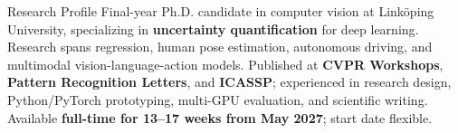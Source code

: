 \begin{rubric}{Research Profile}
\entry*[]
	Final-year Ph.D. candidate in computer vision at Linköping University, specializing in \textbf{uncertainty quantification} for deep learning. Research spans regression, human pose estimation, autonomous driving, and multimodal vision-language-action models.
\entry*[]
	Published at \textbf{CVPR Workshops}, \textbf{Pattern Recognition Letters}, and \textbf{ICASSP}; experienced in research design, Python/PyTorch prototyping, multi-GPU evaluation, and scientific writing.
\entry*[]
	Available \textbf{full-time for 13--17 weeks from May 2027}; start date flexible.
\end{rubric}